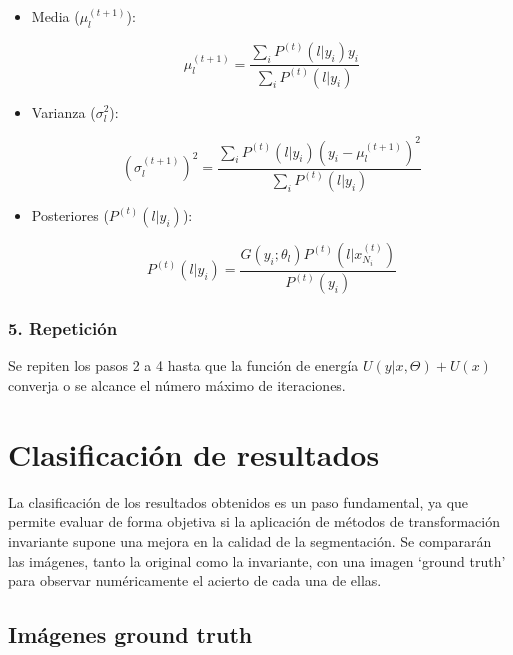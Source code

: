 \begin{itemize}
\setlength{\itemsep}{-1ex}
   \item{\begin{flushleft} Media ($\mu_l^{(t+1)}$): \end{flushleft}}

    $$\mu_l^{(t+1)} =\frac{\sum_i P^{(t)} (l|y_i )y_i }{\sum_i P^{(t)} (l|y_i )}$$

   \item{\begin{flushleft} Varianza ($\sigma_l^2$): \end{flushleft}}

    $$(\sigma_l^{(t+1)} )^2 =\frac{\sum_i P^{(t)} (l|y_i )(y_i -\mu_l^{(t+1)} )^2 }{\sum_i P^{(t)} (l|y_i )}$$

   \item{\begin{flushleft} Posteriores ($P^{(t)} (l|y_i )$): \end{flushleft}}

    $$P^{(t)} (l|y_i )=\frac{G(y_i ;\theta_l )P^{(t)} (l|x_{N_i }^{(t)} )}{P^{(t)} (y_i )}$$
\end{itemize}

\subsubsection{5. Repetición}

Se repiten los pasos 2 a 4 hasta que la función de energía $U(y|x,\Theta )+U(x)$ converja o se alcance el número máximo de iteraciones.

\section{Clasificación de resultados}\label{clasificacion-de-resultados}

La clasificación de los resultados obtenidos es un paso fundamental, ya que permite evaluar de forma objetiva si la aplicación de métodos de transformación invariante supone una mejora en la calidad de la segmentación. Se compararán las imágenes, tanto la original como la invariante, con una imagen `ground truth' para observar numéricamente el acierto de cada una de ellas.

\subsection{Imágenes ground truth}\label{imagenes-ground-truth}

